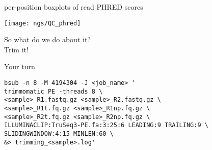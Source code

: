\documentclass[xcolor=dvipsnames]{beamer}
\begin{document}
\begin{frame}
	\large
	per-position boxplots of read PHRED scores \\
	\begin{center}
		\texttt{[image: ngs/QC\_phred]}
	\end{center}
\end{frame}

\begin{frame}
	\begin{center}
		So what do we do about it? \\
		Trim it!
	\end{center}
\end{frame}

\begin{frame}[fragile]
	\begin{center}
		\Huge
		Your turn
	\end{center}
\large
\begin{verbatim}
bsub -n 8 -M 4194304 -J <job_name> '
trimmomatic PE -threads 8 \
<sample>_R1.fastq.gz <sample>_R2.fastq.gz \
<sample>_R1t.fq.gz <sample>_R1np.fq.gz \
<sample>_R2t.fq.gz <sample>_R2np.fq.gz \
ILLUMINACLIP:TruSeq3-PE.fa:3:25:6 LEADING:9 TRAILING:9 \
SLIDINGWINDOW:4:15 MINLEN:60 \
&> trimming_<sample>.log'
\end{verbatim}
\end{frame}
\end{document}
